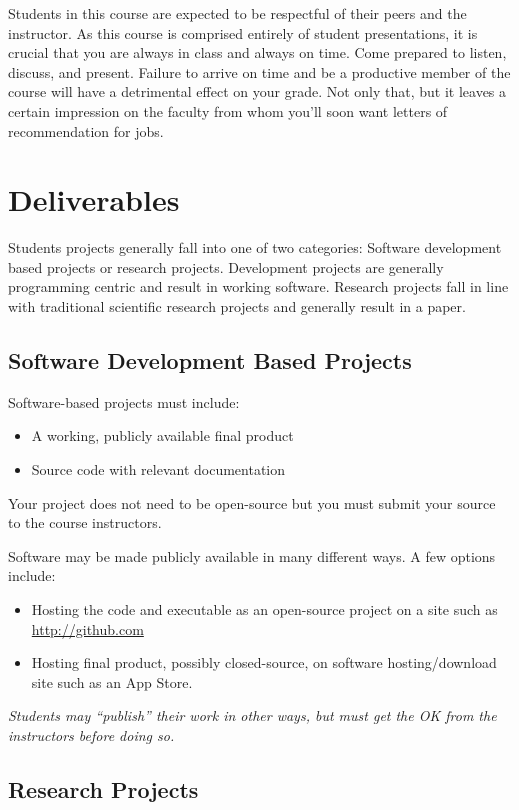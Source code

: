 \documentclass[10pt]{article}
\begin{document}
Students in this course are expected to be respectful of their peers and the instructor. As this course is comprised entirely of student presentations, it is crucial that you are always in class and always on time.  Come prepared to listen, discuss, and present.  Failure to arrive on time and be a productive member of the course will have a detrimental effect on your grade.  Not only that, but it leaves a certain impression on the faculty from whom you'll soon want letters of recommendation for jobs.  

\section{Deliverables}

Students projects generally fall into one of two categories: Software development based projects or research projects.  Development projects are generally programming centric and result in working software.  Research projects fall in line with traditional scientific research projects and generally result in a paper. 

\subsection{Software Development Based Projects}

Software-based projects must include:
\begin{itemize}
\item A working, publicly available final product
\item Source code with relevant documentation
\end{itemize}
Your project does not need to be open-source but you must submit your source to the course instructors.

Software may be made publicly available in many different ways.  A few options include:
\begin{itemize}
\item Hosting the code and executable as an open-source project on a site such as \url{http://github.com}
\item Hosting final product, possibly closed-source, on software hosting/download site such as an App Store.
\end{itemize}
\textit{Students may ``publish'' their work in other ways, but must get the OK from the instructors before doing so.}

\subsection{Research Projects}
\end{document}
